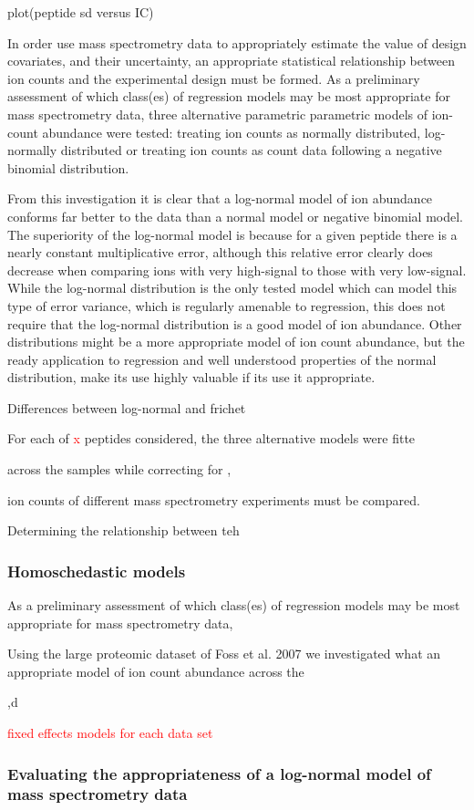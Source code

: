 \documentclass[12pt]{article}
\begin{document}
plot(peptide sd versus IC)


In order use mass spectrometry data to appropriately estimate the value of design covariates, and their uncertainty, an appropriate statistical relationship between ion counts and the experimental design must be formed. As a preliminary assessment of which class(es) of regression models may be most appropriate for mass spectrometry data, three alternative parametric parametric models of ion-count abundance were tested: treating ion counts as normally distributed, log-normally distributed or treating ion counts as count data following a negative binomial distribution.



From this investigation it is clear that a log-normal model of ion abundance conforms far better to the data than a normal model or negative binomial model. The superiority of the log-normal model is because for a given peptide there is a nearly constant multiplicative error, although this relative error clearly does decrease when comparing ions with very high-signal to those with very low-signal.  While the log-normal distribution is the only tested model which can model this type of error variance, which is regularly amenable to regression, this does not require that the log-normal distribution is a good model of ion abundance.  Other distributions might be a more appropriate model of ion count abundance, but the ready application to regression and well understood properties of the normal distribution, make its use highly valuable if its use it appropriate.





Differences between log-normal and frichet


For each of \textcolor{red}{x} peptides considered, the three alternative models were fitte

 across the samples while correcting for ,


ion counts of different mass spectrometry experiments must be compared.  

Determining the relationship between teh 



\subsubsection{Homoschedastic models}

As a preliminary assessment of which class(es) of regression models may be most appropriate for mass spectrometry data, 

Using the large proteomic dataset of Foss et al. 2007 we investigated what an appropriate model of ion count abundance across the 

,d 

\textcolor{red}{fixed effects models for each data set}

\subsubsection{Evaluating the appropriateness of a log-normal model of mass spectrometry data}
\end{document}
